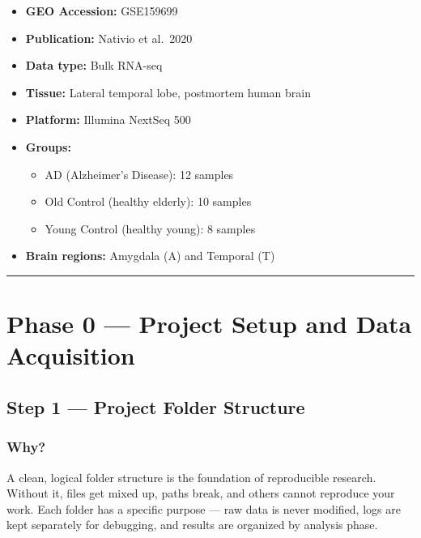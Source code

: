 \documentclass[
]{article}
\providecommand{\tightlist}{%
  \setlength{\itemsep}{0pt}\setlength{\parskip}{0pt}}
\begin{document}
\begin{itemize}
\tightlist
\item
  \textbf{GEO Accession:} GSE159699
\item
  \textbf{Publication:} Nativio et al.~2020
\item
  \textbf{Data type:} Bulk RNA-seq
\item
  \textbf{Tissue:} Lateral temporal lobe, postmortem human brain
\item
  \textbf{Platform:} Illumina NextSeq 500
\item
  \textbf{Groups:}

  \begin{itemize}
  \tightlist
  \item
    AD (Alzheimer's Disease): 12 samples
  \item
    Old Control (healthy elderly): 10 samples
  \item
    Young Control (healthy young): 8 samples
  \end{itemize}
\item
  \textbf{Brain regions:} Amygdala (A) and Temporal (T)
\end{itemize}

\begin{center}\rule{0.5\linewidth}{0.5pt}\end{center}

\section{Phase 0 --- Project Setup and Data
Acquisition}\label{phase-0-project-setup-and-data-acquisition}

\subsection{Step 1 --- Project Folder
Structure}\label{step-1-project-folder-structure}

\subsubsection{Why?}\label{why}

A clean, logical folder structure is the foundation of reproducible
research. Without it, files get mixed up, paths break, and others cannot
reproduce your work. Each folder has a specific purpose --- raw data is
never modified, logs are kept separately for debugging, and results are
organized by analysis phase.
\end{document}
